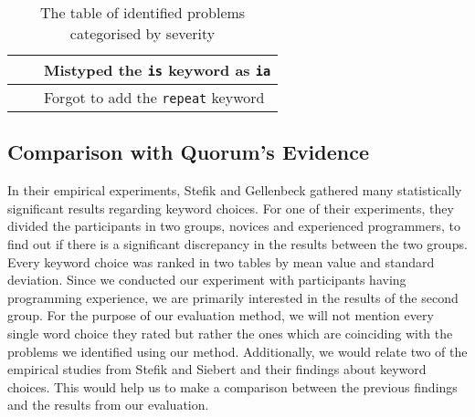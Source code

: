\documentclass[preprint,10pt]{sigplanconf}
\begin{document}
\begin{table*}[]
\begin{minipage}[c]{\textwidth}
\begin{center}
\begin{tabular}{| p{5cm} | p{5cm} | p{5cm} |}
                                                           &                                                                    & Mistyped the \lstinline!is! keyword as \lstinline!ia!					                                   \\ \hline
                                                           &                                                                    & Forgot to add the \lstinline!repeat! keyword		                                                       \\ \hline
\end{tabular}
\end{center}
\caption{The table of identified problems categorised by severity}
\label{QuorumProblemResult}
\end{minipage}
\end{table*}

\subsection{Comparison with Quorum's Evidence}
In their empirical experiments, Stefik and Gellenbeck \cite{EmpStudiesonStimuli} gathered many statistically significant results regarding keyword choices. 
For one of their  experiments, they divided the participants in two groups, novices and experienced programmers, to find out if there is a significant discrepancy in the results between the two groups. Every keyword choice was ranked in two tables by mean value and standard deviation. Since we conducted our experiment with participants having programming experience, we are primarily interested in the results of the second group. For the purpose of our evaluation method, we will not mention every single word choice they rated but rather the ones which are coinciding with the problems we identified using our method.
Additionally, we would relate two of the empirical studies from Stefik and Siebert \cite{Empiricalinvestigation} and their findings about keyword choices. This would help us to make a comparison between the previous findings and the results from our evaluation.
\end{document}
